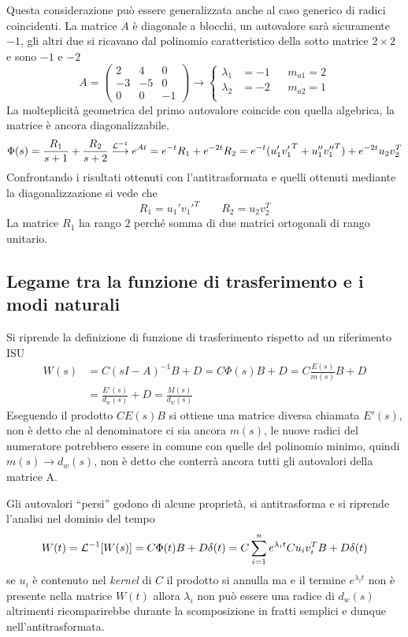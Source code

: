 \newpage
Questa considerazione può essere generalizzata anche al caso generico di radici
coincidenti. La matrice $A$ è diagonale a blocchi, un autovalore sarà
sicuramente $-1$, gli altri due si ricavano dal polinomio caratteristico della
sotto matrice $2\times2$ e sono $-1$ e $-2$
$$
A =
\begin{pmatrix}
 2 & 4 & 0 \\
 -3 & -5 & 0 \\
 0 & 0 & -1
\end{pmatrix} \longrightarrow
\left\{
\begin{aligned}
 \lambda_1 &= -1 & & m_{a1} = 2 \\
  \lambda_2 &= -2 & & m_{a2} = 1 \\
\end{aligned}\right.
$$
La molteplicità geometrica del primo autovalore coincide con quella algebrica,
la matrice è ancora diagonalizzabile.
$$
\Phi(s) = \frac{R_1}{s+1} + \frac{R_2}{s+2}
\stackrel{\mathcal{L}^{-1}}{\longrightarrow} e^{At} = e^{-t}R_1 + e^{-2t}R_2 =
e^{-t}(u_1' {v_1'}^{T} + u_1'' {v_1''}^{T}) + e^{-2t}u_2v_2^T
$$
Confrontando i risultati ottenuti con l'antitrasformata e quelli ottenuti
mediante la diagonalizzazione si vede che
$$
R_1 = u_1' {v_1'}^{T} \qquad R_2 = u_2v_2^T
$$
La matrice $R_1$ ha rango $2$ perché somma di due matrici ortogonali di rango
unitario.

\subsection{Legame tra la funzione di trasferimento e i modi naturali}
Si riprende la definizione di funzione di trasferimento rispetto ad un
riferimento ISU
$$\begin{aligned}
W(s) &= C(sI-A)^{-1} B +D = C\Phi(s) B +D = C\frac{E(s)}{m(s)}B +D\\
&= \frac{E'(s)}{d_w(s)} + D = \frac{M(s)}{d_w(s)}
\end{aligned}$$
Eseguendo il prodotto $CE(s)B$ si ottiene una matrice diversa chiamata $E'(s)$,
non è detto che al denominatore ci sia ancora $m(s)$, le nuove radici del
numeratore potrebbero essere in comune con quelle del polinomio minimo, quindi
$m(s)\rightarrow d_w(s)$, non è detto che conterrà ancora tutti gli autovalori
della matrice A.

Gli autovalori ``persi'' godono di alcune proprietà, si antitrasforma e si
riprende l'analisi nel dominio del tempo
$$
W(t) = \mathcal{L}^{-1}[W(s)] = C\Phi(t)B +D\delta(t) = C\sum_{i=1}^ne^{\lambda_i t}
Cu_iv_i^TB + D\delta(t)
$$
se $u_i$ è contenuto nel \textit{kernel} di $C$ il prodotto si annulla ma e il
termine $e^{\lambda_i t}$ non è presente nella matrice $W(t)$ allora
$\lambda_i$ non può essere una radice di $d_w(s)$ altrimenti ricomparirebbe
durante la scomposizione in fratti semplici e dunque nell'antitrasformata.

